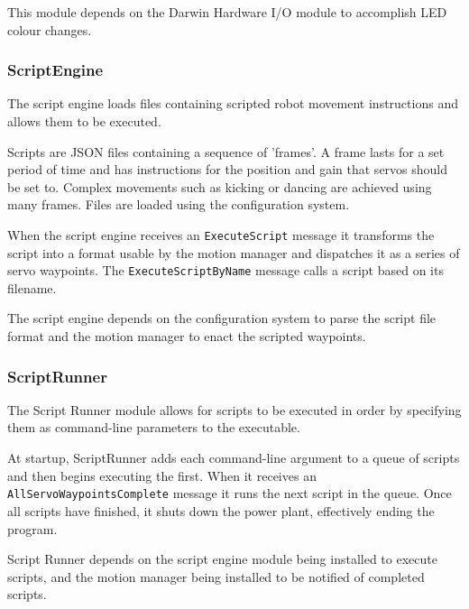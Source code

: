 \documentclass[english,12pt]{scrartcl}
\begin{document}
				This module depends on the Darwin Hardware I/O module to accomplish LED colour
				changes.


			\subsubsection{ScriptEngine}
				The script engine loads files containing scripted robot movement instructions and
				allows them to be executed.

				Scripts are JSON files containing a sequence of 'frames'. A frame lasts for a
				set period of time and has instructions for the position and gain that servos
				should be set to. Complex movements such as kicking or dancing are achieved
				using many frames. Files are loaded using the configuration system.

				When the script engine receives an \texttt{ExecuteScript} message it transforms
				the script into a format usable by the motion manager and dispatches it as a
				series of servo waypoints. The \texttt{ExecuteScriptByName} message calls a script
				based on its filename.

				The script engine depends on the configuration system to parse the script file
				format and the motion manager to enact the scripted waypoints.


			\subsubsection{ScriptRunner}
				The Script Runner module allows for scripts to be executed in order by specifying
				them as command-line parameters to the executable.

				At startup, ScriptRunner adds each command-line argument to a queue of scripts
				and then begins executing the first. When it receives an
				\texttt{AllServoWaypointsComplete} message it runs the next script in the queue.
				Once all scripts have finished, it shuts down the power plant, effectively ending
				the program.

				Script Runner depends on the script engine module being installed to execute
				scripts, and the motion manager being installed to be notified of completed
				scripts.
\end{document}

